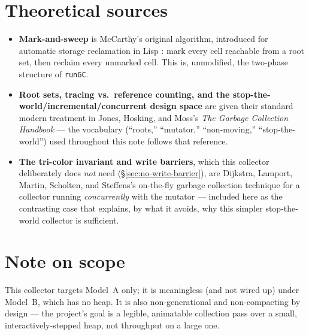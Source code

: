 \documentclass[11pt]{article}
\begin{document}
\section{Theoretical sources}

\begin{itemize}
  \item \textbf{Mark-and-sweep} is McCarthy's original algorithm,
        introduced for automatic storage reclamation in Lisp
        \cite{mccarthy1960recursive}: mark every cell reachable from a
        root set, then reclaim every unmarked cell. This is, unmodified,
        the two-phase structure of \texttt{runGC}.
  \item \textbf{Root sets, tracing vs.\ reference counting, and the
        stop-the-world/incremental/concurrent design space} are given
        their standard modern treatment in Jones, Hosking, and Moss's
        \emph{The Garbage Collection Handbook}
        \cite{jgh2011gchandbook} --- the vocabulary
        (``roots,'' ``mutator,'' ``non-moving,'' ``stop-the-world'') used
        throughout this note follows that reference.
  \item \textbf{The tri-color invariant and write barriers}, which this
        collector deliberately does \emph{not} need
        (\S\ref{sec:no-write-barrier}), are Dijkstra, Lamport, Martin,
        Scholten, and Steffens's on-the-fly garbage collection technique
        for a collector running \emph{concurrently} with the mutator
        \cite{dijkstra1978line} --- included here as the contrasting case
        that explains, by what it avoids, why this simpler
        stop-the-world collector is sufficient.
\end{itemize}

\section*{Note on scope}
This collector targets Model~A only; it is meaningless (and not wired up)
under Model~B, which has no heap. It is also non-generational and
non-compacting by design --- the project's goal is a legible, animatable
collection pass over a small, interactively-stepped heap, not throughput on
a large one.
\end{document}
